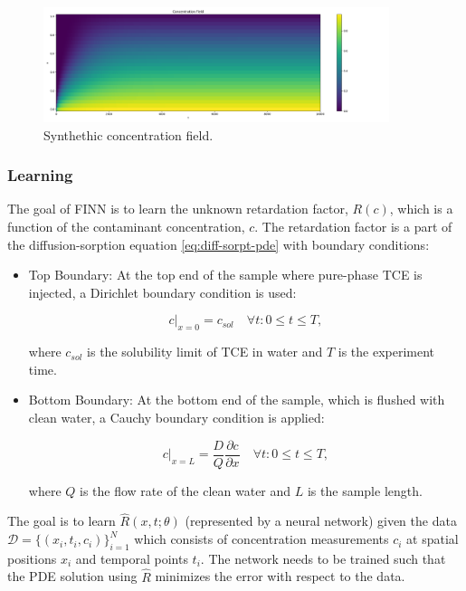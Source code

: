 \documentclass{article}
\begin{document}
\begin{figure}
    \centering
    \includegraphics[width=0.9\textwidth]{figs/c_diss_field_full.png}
    \caption{Synthethic concentration field.}
    \label{fig:c_diss_field_full}
\end{figure}


\subsubsection{Learning}
The goal of FINN is to learn the unknown retardation factor, $R(c)$, which is a function of the contaminant concentration, $c$. The retardation factor is a part of the diffusion-sorption equation \eqref{eq:diff-sorpt-pde} with boundary conditions:

\begin{itemize}
    \item Top Boundary: At the top end of the sample where pure-phase TCE is injected, a Dirichlet boundary condition is used:

    \begin{equation}
        c|_{x=0} = c_{sol} \quad \forall t : 0 \leq t \leq T,
    \end{equation}

    where $c_{sol}$ is the solubility limit of TCE in water and $T$ is the experiment time.

    \item Bottom Boundary: At the bottom end of the sample, which is flushed with clean water, a Cauchy boundary condition is applied:

    \begin{equation}
        c|_{x=L} = \frac{D}{Q} \frac{\partial c}{\partial x} \quad \forall t : 0 \leq t \leq T,
    \end{equation}

    where $Q$ is the flow rate of the clean water and $L$ is the sample length.
\end{itemize}

The goal is to learn $\hat{R}(x,t;\theta)$ (represented by a neural network) given the data $\mathcal{D} = \{ (x_i, t_i, c_i) \}_{i=1}^N$ which consists of concentration measurements $c_i$ at spatial positions $x_i$ and temporal points $t_i$. The network needs to be trained such that the PDE solution using $\hat{R}$ minimizes the error with respect to the data.
\end{document}
